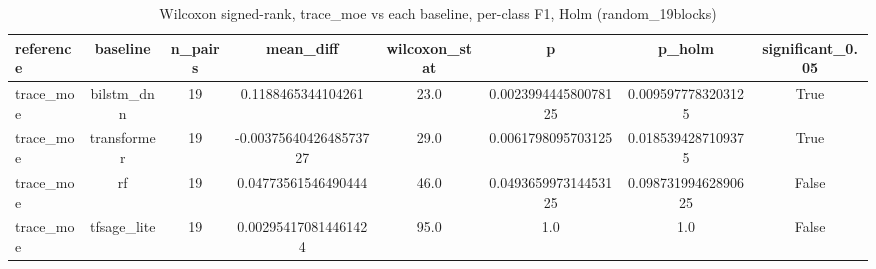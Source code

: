 \begin{table}[htbp]
\centering
\caption{Wilcoxon signed-rank, trace_moe vs each baseline, per-class F1, Holm (random_19blocks)}
\label{tab:wilcoxon_trace_moe_vs_baselines_random_19blocks}
\begin{tabular}{lccccccc}
\toprule
reference & baseline & n\_pairs & mean\_diff & wilcoxon\_stat & p & p\_holm & significant\_0.05 \\
\midrule
trace\_moe & bilstm\_dnn & 19 & 0.1188465344104261 & 23.0 & 0.002399444580078125 & 0.0095977783203125 & True \\
trace\_moe & transformer & 19 & -0.0037564042648573727 & 29.0 & 0.0061798095703125 & 0.0185394287109375 & True \\
trace\_moe & rf & 19 & 0.04773561546490444 & 46.0 & 0.049365997314453125 & 0.09873199462890625 & False \\
trace\_moe & tfsage\_lite & 19 & 0.002954170814461424 & 95.0 & 1.0 & 1.0 & False \\
\bottomrule
\end{tabular}
\end{table}